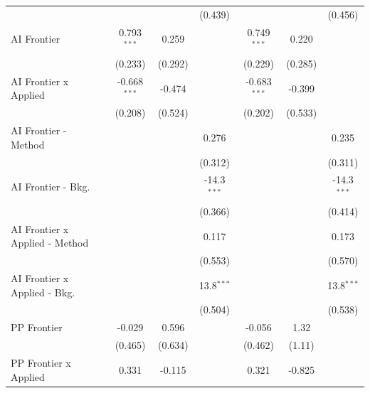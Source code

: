 \begin{tabular}{lcccccc}
                                  &                &              & (0.439)       &                &              & (0.456)\\   
   AI Frontier                    & 0.793$^{***}$  & 0.259        &               & 0.749$^{***}$  & 0.220        &   \\   
                                  & (0.233)        & (0.292)      &               & (0.229)        & (0.285)      &   \\   
   AI Frontier x Applied          & -0.668$^{***}$ & -0.474       &               & -0.683$^{***}$ & -0.399       &   \\   
                                  & (0.208)        & (0.524)      &               & (0.202)        & (0.533)      &   \\   
   AI Frontier - Method           &                &              & 0.276         &                &              & 0.235\\   
                                  &                &              & (0.312)       &                &              & (0.311)\\   
   AI Frontier - Bkg.             &                &              & -14.3$^{***}$ &                &              & -14.3$^{***}$\\   
                                  &                &              & (0.366)       &                &              & (0.414)\\   
   AI Frontier x Applied - Method &                &              & 0.117         &                &              & 0.173\\   
                                  &                &              & (0.553)       &                &              & (0.570)\\   
   AI Frontier x Applied - Bkg.   &                &              & 13.8$^{***}$  &                &              & 13.8$^{***}$\\   
                                  &                &              & (0.504)       &                &              & (0.538)\\   
   PP Frontier                    & -0.029         & 0.596        &               & -0.056         & 1.32         &   \\   
                                  & (0.465)        & (0.634)      &               & (0.462)        & (1.11)       &   \\   
   PP Frontier x Applied          & 0.331          & -0.115       &               & 0.321          & -0.825       &   \\   

\end{tabular}
